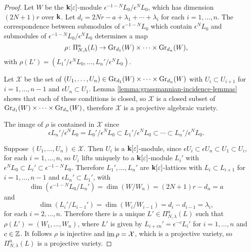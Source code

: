\documentclass[a4paper, 11pt, twoside]{report}
\begin{document}
\begin{proof}
Let $W$ be the $\field[\epsilon]$-module $\epsilon^{-1-N}L_0/{\epsilon^N L_0}$, which has dimension $(2N+1)r$ over $\field$. Let $d_i = 2Nr -a +\lambda_1 +\cdots +\lambda_i$ for each $i=1,\ldots, n$. The correspondence between submodules of $\epsilon^{-1-N}L_0$ which contain $\epsilon^N L_0$ and submodules of $\epsilon^{-1-N}L_0/{\epsilon^N L_0}$ determines a map
\begin{equation*}
\rho\colon\Pi_{N,\lambda}^a(L)\to\GR[d_1]{W}\times\cdots\times\GR[d_n]{W},
\end{equation*}
with $\rho(L')=(L_1'/{\epsilon^N L_0},\ldots,L_n'/{\epsilon^N L_0})$.

Let $\mathcal{X}$ be the set of $(U_1,\ldots, U_n)\in\GR[d_1]{W}\times\cdots\times\GR[d_n]{W}$ with $U_i\subset U_{i+1}$ for $i=1,\ldots,n-1$ and $\epsilon U_n\subset U_1$. Lemma \ref{lemma:grassmannian-incidence-lemmas} shows that each of these conditions is closed, so $\mathcal{X}$ is a closed subset of $\GR[d_1]{W}\times\cdots\times\GR[d_n]{W}$, therefore $\mathcal{X}$ is a projective algebraic variety.

The image of $\rho$ is contained in $\mathcal{X}$ since
\begin{equation*}
\epsilon L_n'/{\epsilon^N L_0} = L_0'/{\epsilon^N L_0} \subset L_1'/{\epsilon^N L_0}\subset\cdots\subset L_n'/{\epsilon^N L_0}.
\end{equation*}

Suppose $(U_1,\ldots,U_n)\in\mathcal{X}$. Then $U_i$ is a $\field[\epsilon]$-module, since $\epsilon U_i\subset \epsilon U_n\subset U_1\subset U_i$, for each $i=1,\ldots,n$, so $U_i$ lifts uniquely to a $\field[\epsilon]$-module $L_i'$ with $\epsilon^N L_0\subset L_i'\subset\epsilon^{-1-N}L_0$. Therefore $L_1',\ldots,L_n'$ are $\field[\epsilon]$-lattices with $L_i\subset L_{i+1}$ for $i=1,\ldots,n-1$ and $\epsilon L_n'\subset L_1'$, with
\begin{equation*}
\dim\left(\epsilon^{-1-N}L_0/{L_n'}\right) = \dim\left(W/{W_n}\right) = (2N+1)r - d_n = a
\end{equation*}
and
\begin{equation*}
\dim\left(L_i'/{L_{i-1}'}\right) = \dim\left(W_i/{W_{i-1}}\right) = d_i - d_{i-1} = \lambda_i,
\end{equation*}
for each $i=2,\ldots,n$. Therefore there is a unique $L'\in\Pi_{N,\lambda}^a(L)$ such that $\rho(L')=(W_1,\ldots, W_n)$, where $L'$ is given by $L_{i+cn}'=\epsilon^{-c}L_i'$ for $i=1,\ldots,n$ and $c\in\integers$. It follows $\rho$ is injective and $\IM{\rho}=\mathcal{X}$, which is a projective variety, so $\Pi_{N,\lambda}^a(L)$ is a projective variety.
\end{proof}
\end{document}
